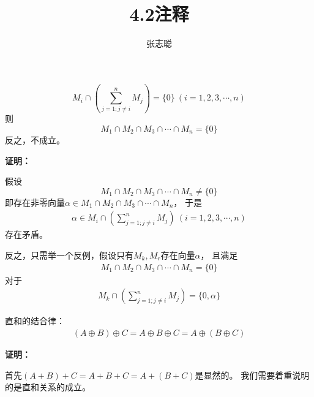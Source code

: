 \documentclass{article}
\begin{document}
\title{4.2注释}
\author{张志聪}
\maketitle

\begin{zremark}
  \[
    M_i \cap (\sum \limits_{j = 1; j \neq i}^n{M_j}) = \{0\}  \ (i = 1, 2, 3, \cdots, n)
  \]
  则
  \[
    M_1 \cap M_2 \cap M_3 \cap \cdots \cap M_n = \{0\}
  \]
  反之，不成立。
\end{zremark}

\textbf{证明：}

假设
\[
  M_1 \cap M_2 \cap M_3 \cap \cdots \cap M_n \neq \{0\}
\]
即存在非零向量$\alpha \in M_1 \cap M_2 \cap M_3 \cap \cdots \cap M_n$，
于是
\begin{align*}
  \alpha \in M_i \cap (\sum \limits_{j = 1; j \neq i}^n{M_j}) \ (i = 1, 2, 3, \cdots, n)
\end{align*}
存在矛盾。

反之，只需举一个反例，假设只有$M_k, M_r$存在向量$\alpha$，
且满足
\begin{align*}
  M_1 \cap M_2 \cap M_3 \cap \cdots \cap M_n = \{0\}
\end{align*}
对于
\begin{align*}
  M_k \cap (\sum \limits_{j = 1; j \neq i}^n{M_j}) = \{0, \alpha\}
\end{align*}

\begin{zremark}
  直和的结合律：
  \begin{align*}
    (A \oplus B) \oplus C = A \oplus B \oplus C = A \oplus (B \oplus C)
  \end{align*}
\end{zremark}

\textbf{证明：}

首先$(A + B) + C = A + B + C = A + (B + C)$是显然的。
我们需要着重说明的是直和关系的成立。
\end{document}
